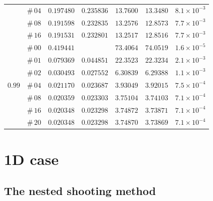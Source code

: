 \documentclass[12pt]{extarticle}
\theoremstyle{plain}
\theoremstyle{remark}
\begin{document}
\begin{table}[!ht]
\begin{center}
\begin{tabular}{ccccccc}
 & $\#\,04$ & $0.197480$ & $0.235836$ & $13.7600$ & $13.3480$ & $8.1\times10^{-3}$ \\
 & $\#\,08$ & $0.191598$ & $0.232835$ & $13.2576$ & $12.8573$ & $7.7\times10^{-3}$ \\
 & $\#\,16$ & $0.191531$ & $0.232801$ & $13.2517$ & $12.8516$ & $7.7\times10^{-3}$ \\
\midrule
\multirow{7}{*}{$0.99$} & $\#\,00$ & $0.419441$ &  & $73.4064$ & $74.0519$ & $1.6\times10^{-5}$ \\
 & $\#\,01$ & $0.079369$ & $0.044851$ & $22.3523$ & $22.3234$ & $2.1\times10^{-3}$ \\
 & $\#\,02$ & $0.030493$ & $0.027552$ & $6.30839$ & $6.29388$ & $1.1\times10^{-3}$ \\
 & $\#\,04$ & $0.021170$ & $0.023687$ & $3.93049$ & $3.92015$ & $7.5\times10^{-4}$ \\
 & $\#\,08$ & $0.020359$ & $0.023303$ & $3.75104$ & $3.74103$ & $7.1\times10^{-4}$ \\
 & $\#\,16$ & $0.020348$ & $0.023298$ & $3.74872$ & $3.73871$ & $7.1\times10^{-4}$ \\
 & $\#\,20$ & $0.020348$ & $0.023298$ & $3.74870$ & $3.73869$ & $7.1\times10^{-4}$ \\
\bottomrule
\end{tabular}
\label{supp-table-3D-IterativeMethod-M=0}
\end{center}
\end{table}

\clearpage
\section*{1D case}
\subsection*{The nested shooting method}
\end{document}
